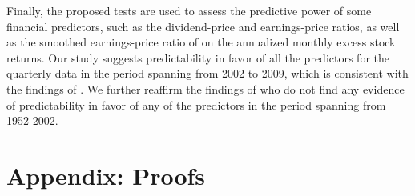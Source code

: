 \documentclass[harvard,11pt]{article}
\begin{document}
Finally, the proposed tests are used to assess the predictive power of some
financial predictors, such as the dividend-price and earnings-price ratios, as well as the smoothed earnings-price ratio of \citet{campbell1988dividend,campbell2001valuation} on the annualized monthly excess stock returns. Our study suggests predictability in favor of all the predictors for the quarterly data in the period spanning from 2002 to 2009, which is consistent with the findings of \citet{campbell2006efficient}. We further reaffirm the findings of \citet{campbell2006efficient} who do not find any evidence of predictability in favor of any of the predictors in the period spanning from 1952-2002. 

\newpage

 

\newpage

\section{Appendix: Proofs \label{Appendix: ProofsC1}}
\end{document}
